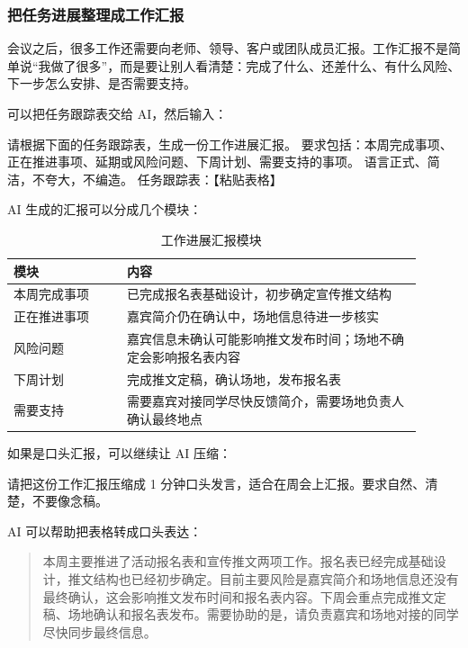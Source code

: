\subsubsection*{把任务进展整理成工作汇报}

会议之后，很多工作还需要向老师、领导、客户或团队成员汇报。工作汇报不是简单说“我做了很多”，而是要让别人看清楚：完成了什么、还差什么、有什么风险、下一步怎么安排、是否需要支持。

可以把任务跟踪表交给 AI，然后输入：

\begin{tcolorbox}[promptbox]
请根据下面的任务跟踪表，生成一份工作进展汇报。
要求包括：本周完成事项、正在推进事项、延期或风险问题、下周计划、需要支持的事项。
语言正式、简洁，不夸大，不编造。
任务跟踪表：【粘贴表格】
\end{tcolorbox}

AI 生成的汇报可以分成几个模块：

\begin{table}[H]
\centering
\caption{工作进展汇报模块}
\label{tab:work-progress-report-modules}
\begin{tabular}{p{0.25\linewidth} p{0.65\linewidth}}
\toprule
\textbf{模块} & \textbf{内容} \\
\midrule
本周完成事项 & 已完成报名表基础设计，初步确定宣传推文结构 \\
正在推进事项 & 嘉宾简介仍在确认中，场地信息待进一步核实 \\
风险问题 & 嘉宾信息未确认可能影响推文发布时间；场地不确定会影响报名表内容 \\
下周计划 & 完成推文定稿，确认场地，发布报名表 \\
需要支持 & 需要嘉宾对接同学尽快反馈简介，需要场地负责人确认最终地点 \\
\bottomrule
\end{tabular}
\end{table}

如果是口头汇报，可以继续让 AI 压缩：

\begin{tcolorbox}[promptbox]
请把这份工作汇报压缩成 1 分钟口头发言，适合在周会上汇报。要求自然、清楚，不要像念稿。
\end{tcolorbox}

AI 可以帮助把表格转成口头表达：

\begin{quote}
本周主要推进了活动报名表和宣传推文两项工作。报名表已经完成基础设计，推文结构也已经初步确定。目前主要风险是嘉宾简介和场地信息还没有最终确认，这会影响推文发布时间和报名表内容。下周会重点完成推文定稿、场地确认和报名表发布。需要协助的是，请负责嘉宾和场地对接的同学尽快同步最终信息。
\end{quote}

